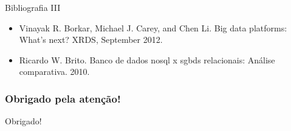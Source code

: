 \begin{frame}{Bibliografia III}
\begin{itemize}

\item Vinayak R. Borkar, Michael J. Carey, and Chen Li. Big data platforms: What's
next? XRDS, September 2012.

\item Ricardo W. Brito. Banco de dados nosql x sgbds relacionais: Análise comparativa.
2010.
\end{itemize}
\end{frame}

\appendix

\begin{frame}
  \frametitle{Obrigado pela atenção!}
  \begin{center}
    {\Huge Obrigado!}
  \end{center}
\end{frame}
